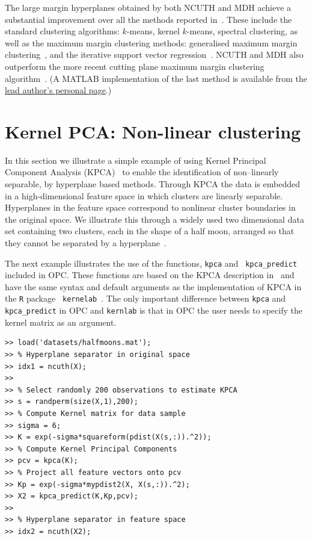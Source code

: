 \documentclass{book}
\begin{document}
\noindent
%
The large margin hyperplanes obtained by both NCUTH and MDH achieve a
substantial improvement over all the methods reported
in~\cite[Table~IV]{ZhangTK2009}. These include the standard clustering
algorithms: $k$-means, kernel $k$-means, spectral clustering, as well as
the maximum margin clustering methods: generalised maximum margin
clustering~\cite{Valizadegan2006}, and the iterative support vector regression~\cite{ZhangTK2009}.
NCUTH and MDH also outperform the more recent cutting plane maximum margin
clustering algorithm~\cite{WangZZ2010}. (A MATLAB implementation of the last
method is available from the
\href{https://sites.google.com/site/binzhao02/CPMMC.rar?attredirects=0} {lead
author's personal page}.)



\section{Kernel PCA: Non-linear clustering}\label{sec:kpca}

In this section we illustrate a simple example of using Kernel Principal
Component Analysis (KPCA)~\cite{ScholkopfSM1998} to enable the identification of
non--linearly separable, by hyperplane based methods.
%
Through KPCA the data is embedded in a high-dimensional feature space in which
clusters are linearly separable. Hyperplanes in the feature space correspond to
nonlinear cluster boundaries in the original space.  We illustrate this through
a widely used two dimensional data set containing two clusters, each in the
shape of a half moon, arranged so that they cannot be separated by a
hyperplane~\cite{Jain2005}. 

The next example illustrates the use of the functions, {\tt kpca} and {\tt
kpca\_predict} included in OPC. These functions are based on the KPCA
description in~\cite{ScholkopfSM1998} and have the same syntax and default
arguments as the implementation of KPCA in the {\tt R} package {\tt
kernelab}~\cite{kernlab}. The only important difference between {\tt kpca} and
{\tt kpca\_predict} in OPC and {\tt kernlab} is that in OPC the user needs to
specify the kernel matrix as an argument.


\begin{verbatim}
>> load('datasets/halfmoons.mat');
>> % Hyperplane separator in original space
>> idx1 = ncuth(X);
>>
>> % Select randomly 200 observations to estimate KPCA
>> s = randperm(size(X,1),200);
>> % Compute Kernel matrix for data sample
>> sigma = 6;
>> K = exp(-sigma*squareform(pdist(X(s,:)).^2));
>> % Compute Kernel Principal Components
>> pcv = kpca(K);
>> % Project all feature vectors onto pcv
>> Kp = exp(-sigma*mypdist2(X, X(s,:)).^2);
>> X2 = kpca_predict(K,Kp,pcv);
>>
>> % Hyperplane separator in feature space
>> idx2 = ncuth(X2);
\end{verbatim}
\end{document}
